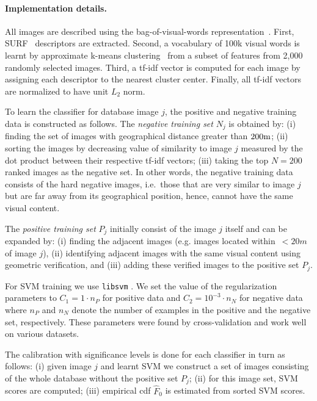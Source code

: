    \paragraph{Implementation details.}
      All images are described using the bag-of-visual-words representation~\cite{Sivic2003}. First, SURF~\cite{Bay06} 
      descriptors are extracted. Second, a vocabulary of 100k visual words is learnt by approximate k-means clustering~\cite{Philbin07} from a subset of features from 2,000 randomly selected images. Third, a tf-idf vector is computed for each image by assigning each descriptor to the nearest cluster center.  Finally, all tf-idf vectors are normalized to have unit $L_2$ norm.

      To learn the classifier for database image $j$, the positive and negative training data
      is constructed as follows. 
      The \emph{negative training set} $N_j$ is obtained by: (i) finding the set of images with geographical distance greater than $200{\rm m}$; (ii)  sorting the images by decreasing value of similarity to image $j$ measured by the dot product between their respective tf-idf vectors; (iii) taking the top $N=200$ ranked images as the negative set. 
      In other words, the negative training data consists of the hard negative images, i.e.\ those that are very similar to image $j$ but are far away from its geographical position, hence, cannot have the same visual content.

      The \emph{positive training set} $P_j$ initially consist of the image $j$ itself and can be expanded by:  (i) finding the adjacent images (e.g. images located within~$<20m$ of image $j$), (ii) identifying adjacent images with the same visual content using geometric verification, and (iii) adding these verified images to the positive set $P_j$.

      For SVM training we use {\tt libsvm} \cite{libsvm}. We set the value of the regularization parameters to $C_1=1 \cdot n_P$ for positive data and $C_2=10^{-3} \cdot n_N$ for negative data where $n_P$ and $n_N$ denote the number of examples in the positive and the negative set, respectively. These parameters were found by cross-validation and work well on various datasets. 

      The calibration with significance levels is done for each classifier in turn as follows: (i) given image $j$ and learnt SVM we construct a set of images consisting of the whole database without the positive set $P_j$; (ii) for this image set, SVM scores are computed; (iii) empirical cdf $\hat{F}_0$ is estimated from sorted SVM scores.

